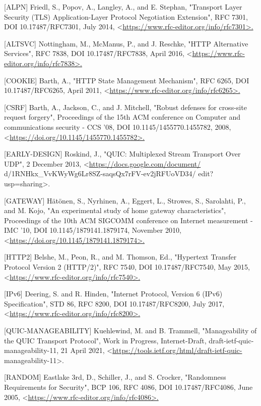 \documentclass{article}
\begin{document}
[ALPN]     Friedl, S., Popov, A., Langley, A., and E. Stephan, "Transport Layer Security (TLS) Application-Layer Protocol Negotiation Extension", RFC 7301, DOI 10.17487/RFC7301, July 2014, <\url{https://www.rfc-editor.org/info/rfc7301>.}

[ALTSVC]   Nottingham, M., McManus, P., and J. Reschke, "HTTP Alternative Services", RFC 7838, DOI 10.17487/RFC7838, April 2016, <\url{https://www.rfc-editor.org/info/rfc7838>.}

[COOKIE]   Barth, A., "HTTP State Management Mechanism", RFC 6265, DOI 10.17487/RFC6265, April 2011, <\url{https://www.rfc-editor.org/info/rfc6265>.}

[CSRF]     Barth, A., Jackson, C., and J. Mitchell, "Robust defenses for cross-site request forgery", Proceedings of the 15th ACM conference on Computer and communications security - CCS '08, DOI 10.1145/1455770.1455782, 2008, <\url{https://doi.org/10.1145/1455770.1455782>.}

[EARLY-DESIGN] Roskind, J., "QUIC: Multiplexed Stream Transport Over UDP", 2 December 2013, <\url{https://docs.google.com/document/} d/1RNHkx\_VvKWyWg6Lr8SZ-saqsQx7rFV-ev2jRFUoVD34/ edit?usp=sharing>.

[GATEWAY]  Hätönen, S., Nyrhinen, A., Eggert, L., Strowes, S., Sarolahti, P., and M. Kojo, "An experimental study of home gateway characteristics", Proceedings of the 10th ACM SIGCOMM conference on Internet measurement - IMC '10, DOI 10.1145/1879141.1879174, November 2010, <\url{https://doi.org/10.1145/1879141.1879174>.}

[HTTP2]    Belshe, M., Peon, R., and M. Thomson, Ed., "Hypertext Transfer Protocol Version 2 (HTTP/2)", RFC 7540, DOI 10.17487/RFC7540, May 2015, <\url{https://www.rfc-editor.org/info/rfc7540>.}

[IPv6]     Deering, S. and R. Hinden, "Internet Protocol, Version 6 (IPv6) Specification", STD 86, RFC 8200, DOI 10.17487/RFC8200, July 2017, <\url{https://www.rfc-editor.org/info/rfc8200>.}

[QUIC-MANAGEABILITY] Kuehlewind, M. and B. Trammell, "Manageability of the QUIC Transport Protocol", Work in Progress, Internet-Draft, draft-ietf-quic-manageability-11, 21 April 2021, <\url{https://tools.ietf.org/html/draft-ietf-quic-} manageability-11>.

[RANDOM]   Eastlake 3rd, D., Schiller, J., and S. Crocker, "Randomness Requirements for Security", BCP 106, RFC 4086, DOI 10.17487/RFC4086, June 2005, <\url{https://www.rfc-editor.org/info/rfc4086>.}
\end{document}
